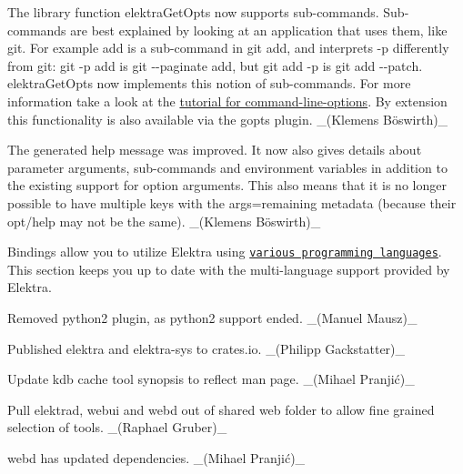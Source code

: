 \begin{DoxyItemize}
\item The library function {\ttfamily elektra\+Get\+Opts} now supports sub-\/commands. Sub-\/commands are best explained by looking at an application that uses them, like {\ttfamily git}. For example {\ttfamily add} is a sub-\/command in {\ttfamily git add}, and interprets {\ttfamily -\/p} differently from {\ttfamily git}\+: {\ttfamily git -\/p add} is {\ttfamily git -\/-\/paginate add}, but {\ttfamily git add -\/p} is {\ttfamily git add -\/-\/patch}. {\ttfamily elektra\+Get\+Opts} now implements this notion of sub-\/commands. For more information take a look at the \hyperlink{doc_tutorials_command-line-options_md}{tutorial for command-\/line-\/options}. By extension this functionality is also available via the {\ttfamily gopts} plugin. \+\_\+(Klemens Böswirth)\+\_\+
\item The generated help message was improved. It now also gives details about parameter arguments, sub-\/commands and environment variables in addition to the existing support for option arguments. This also means that it is no longer possible to have multiple keys with the {\ttfamily args=remaining} metadata (because their {\ttfamily opt/help} may not be the same). \+\_\+(Klemens Böswirth)\+\_\+
\end{DoxyItemize}

Bindings allow you to utilize Elektra using \href{https://www.libelektra.org/bindings/readme}{\tt various programming languages}. This section keeps you up to date with the multi-\/language support provided by Elektra.


\begin{DoxyItemize}
\item Removed python2 plugin, as python2 support ended. \+\_\+(\+Manuel Mausz)\+\_\+
\end{DoxyItemize}


\begin{DoxyItemize}
\item Published {\ttfamily elektra} and {\ttfamily elektra-\/sys} to crates.\+io. \+\_\+(\+Philipp Gackstatter)\+\_\+
\end{DoxyItemize}


\begin{DoxyItemize}
\item Update {\ttfamily kdb cache} tool synopsis to reflect man page. \+\_\+(Mihael Pranjić)\+\_\+
\item Pull elektrad, webui and webd out of shared web folder to allow fine grained selection of tools. \+\_\+(\+Raphael Gruber)\+\_\+
\item webd has updated dependencies. \+\_\+(Mihael Pranjić)\+\_\+
\end{DoxyItemize}


